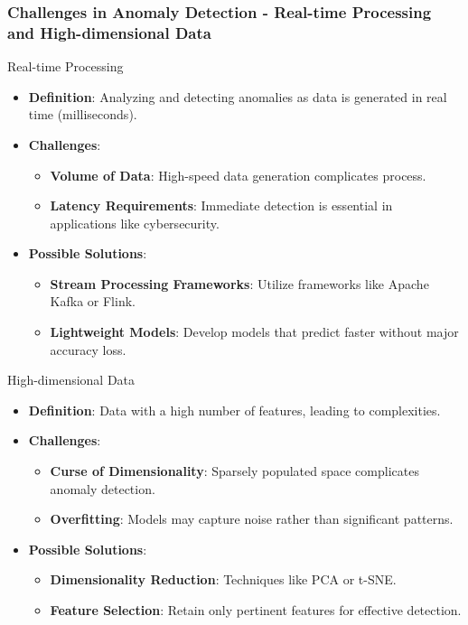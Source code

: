 \documentclass{beamer}
\begin{document}
\begin{frame}[fragile]
    \frametitle{Challenges in Anomaly Detection - Real-time Processing and High-dimensional Data}
    \begin{block}{Real-time Processing}
        \begin{itemize}
            \item \textbf{Definition}: Analyzing and detecting anomalies as data is generated in real time (milliseconds).
            \item \textbf{Challenges}: 
            \begin{itemize}
                \item \textbf{Volume of Data}: High-speed data generation complicates process.
                \item \textbf{Latency Requirements}: Immediate detection is essential in applications like cybersecurity.
            \end{itemize}
            \item \textbf{Possible Solutions}:
            \begin{itemize}
                \item \textbf{Stream Processing Frameworks}: Utilize frameworks like Apache Kafka or Flink.
                \item \textbf{Lightweight Models}: Develop models that predict faster without major accuracy loss.
            \end{itemize}
        \end{itemize}
    \end{block}

    \begin{block}{High-dimensional Data}
        \begin{itemize}
            \item \textbf{Definition}: Data with a high number of features, leading to complexities.
            \item \textbf{Challenges}:
            \begin{itemize}
                \item \textbf{Curse of Dimensionality}: Sparsely populated space complicates anomaly detection.
                \item \textbf{Overfitting}: Models may capture noise rather than significant patterns.
            \end{itemize}
            \item \textbf{Possible Solutions}:
            \begin{itemize}
                \item \textbf{Dimensionality Reduction}: Techniques like PCA or t-SNE.
                \item \textbf{Feature Selection}: Retain only pertinent features for effective detection.
            \end{itemize}
        \end{itemize}
    \end{block}
\end{frame}
\end{document}
